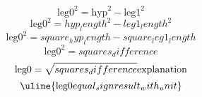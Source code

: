 \[\text{{{leg0}}}^{{2}}=\text{{{hyp}}}^{{2}}-\text{{{leg1}}}^{{2}}\]
\[\text{{{leg0}}}^{{2}}={hyp_length}^{{2}}-{leg1_length}^{{2}}\]
\[\text{{{leg0}}}^{{2}}={square_hyp_length}-{square_leg1_length}\]
\[\text{{{leg0}}}^{{2}}={squares_difference}\]
\[\text{{{leg0}}}=\sqrt{{\mathstrut {squares_difference}}}\text{{{explanation}}}\]
\[\uline{{\text{{{leg0}}}{equal_sign}{result_with_unit}}}\]